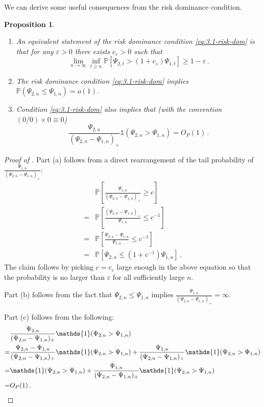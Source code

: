 \documentclass[11pt]{article}
\theoremstyle{plain}
\newtheorem{proposition}[theorem]{Proposition}
\begin{document}
We can derive some useful consequences from the risk dominance condition.
\begin{proposition}\label{pro:3.1-conseq-risk-dom}
\begin{enumerate}
    \item [(a)] An equivalent statement of the risk dominance condition \eqref{eq:3.1-risk-dom} is that for any $\varepsilon>0$ there exists $c_\varepsilon>0$ such that
  $$\lim_{n\rightarrow\infty}\inf_{t\ge n}\mathbb P[\Psi_{2,t}>(1+c_\varepsilon)\Psi_{1,t}]\ge 1-\varepsilon\,.$$
  \item [(b)] The risk dominance condition \eqref{eq:3.1-risk-dom} implies $\mathbb P(\Psi_{2,n}\le \Psi_{1,n})=o(1)$.
  \item [(c)] Condition \eqref{eq:3.1-risk-dom} also implies that (with the convention $(0/0)\times 0\equiv 0$)
  $$
  \frac{\Psi_{2,n}}{(\Psi_{2,n}-\Psi_{1,n})_+}\mathds{1}(\Psi_{2,n}>\Psi_{1,n})=O_P(1)\,.
  $$
\end{enumerate}
\end{proposition}
\begin{proof}[Proof of ]
    Part (a) follows from a direct rearrangement of the tail probability of $\frac{\Psi_{1,n}}{(\Psi_{2,n}-\Psi_{1,n})_+}$:
\begin{align*}
    &\mathbb P\left[\frac{\Psi_{1,n}}{(\Psi_{2,n}-\Psi_{1,n})_+}\ge c\right]\\
    =&\mathbb P\left[\frac{(\Psi_{2,n}-\Psi_{1,n})_+}{\Psi_{1,n}}\le c^{-1}\right]\\
    =&\mathbb P\left[\frac{\Psi_{2,n}-\Psi_{1,n}}{\Psi_{1,n}}\le c^{-1}\right]\\
    =&\mathbb P\left[\Psi_{2,n}\le (1+c^{-1})\Psi_{1,n}\right]\,.
\end{align*}
The claim follows by picking $c=c_\varepsilon$ large enough in the above equation so that the probability is no larger than $\varepsilon$ for all sufficiently large $n$. 

Part (b) follows from the fact that $\Psi_{2,n}\le \Psi_{1,n}$ implies $\frac{\Psi_{1,n}}{(\Psi_{2,n}-\Psi_{1,n})_+}=\infty$.

Part (c) follows from the following:
\begin{align*}
   & \frac{\Psi_{2,n}}{(\Psi_{2,n}-\Psi_{1,n})_+}\mathds{1}(\Psi_{2,n}>\Psi_{1,n})\\
   =&\frac{\Psi_{2,n}-\Psi_{1,n}}{(\Psi_{2,n}-\Psi_{1,n})_+}\mathds{1}(\Psi_{2,n}>\Psi_{1,n})+\frac{\Psi_{1,n}}{(\Psi_{2,n}-\Psi_{1,n})_+}\mathds{1}(\Psi_{2,n}>\Psi_{1,n})\\
   =& \mathds{1}(\Psi_{2,n}>\Psi_{1,n})+\frac{\Psi_{1,n}}{(\Psi_{2,n}-\Psi_{1,n})_+}\mathds{1}(\Psi_{2,n}>\Psi_{1,n})\\
   =&O_P(1)\,.\qedhere
\end{align*}
\end{proof}
\end{document}

